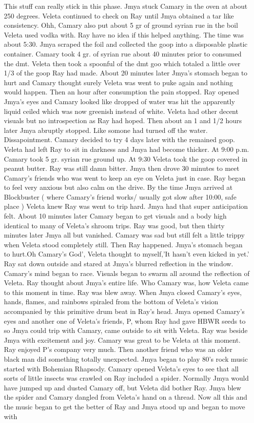 \documentclass[12pt]{book}
\begin{document}
This stuff can really stick in this phase. Jmya stuck Camary in the oven at about 250 degrees. Veleta continued to check on Ray until Jmya obtained a tar like consistency. Ohh, Camary also put about 5 gr of ground syrian rue in the boil Veleta used vodka with. Ray have no idea if this helped anything. The time was about 5:30. Jmya scraped the foil and collected the goop into a disposable plastic container. Camary took 4 gr. of syrian rue about 40 minutes prior to consumed the dmt. Veleta then took a spoonful of the dmt goo which totaled a little over 1/3 of the goop Ray had made. About 20 minutes later Jmya's stomach began to hurt and Camary thought surely Veleta was went to puke again and nothing would happen. Then an hour after consumption the pain stopped. Ray opened Jmya's eyes and Camary looked like dropped of water was hit the apparently liquid ceiled which was now greenish instead of white. Veleta had other decent visuals but no introspection as Ray had hoped. Then about an 1 and 1/2 hours later Jmya abruptly stopped. Like somone had turned off the water. Dissapointment. Camary decided to try 4 days later with the remained goop. Veleta had left Ray to sit in darkness and Jmya had become thicker. At 9:00 p.m. Camary took 5 gr. syrian rue ground up. At 9:30 Veleta took the goop covered in peanut butter. Ray was still damn bitter. Jmya then drove 30 minutes to meet Camary's friends who was went to keep an eye on Veleta just in case. Ray began to feel very anxious but also calm on the drive. By the time Jmya arrived at Blockbuster (  where Camary's friend works/ usually got slow after 10:00, safe place  ) Veleta knew Ray was went to trip hard. Jmya had that super anticipation felt. About 10 minutes later Camary began to get visuals and a body high identical to many of Veleta's shroom trips. Ray was good, but then thirty minutes later Jmya all but vanished. Camary was sad but still felt a little trippy when Veleta stood completely still. Then Ray happened. Jmya's stomach began to hurt.Oh Camary's God', Veleta thought to myself,'It hasn't even kicked in yet.' Ray sat down outside and stared at Jmya's blurred reflection in the window. Camary's mind began to race. Visuals began to swarm all around the reflection of Veleta. Ray thought about Jmya's entire life. Who Camary was, how Veleta came to this moment in time. Ray was blew away. When Jmya closed Camary's eyes, hands, flames, and rainbows spiraled from the bottom of Veleta's vision accompanied by this primitive drum beat in Ray's head. Jmya opened Camary's eyes and another one of Veleta's friends, P, whom Ray had gave HBWR seeds to so Jmya could trip with Camary, came outside to sit with Veleta. Ray was beside Jmya with excitement and joy. Camary was great to be Veleta at this moment. Ray enjoyed P's company very much. Then another friend who was an older black man did something totally unexpected. Jmya began to play 80's rock music started with Bohemian Rhapsody. Camary opened Veleta's eyes to see that all sorts of little insects was crawled on Ray included a spider. Normally Jmya would have jumped up and dusted Camary off, but Veleta did bother Ray. Jmya blew the spider and Camary dangled from Veleta's hand on a thread. Now all this and the music began to get the better of Ray and Jmya stood up and began to move with 
\end{document}
